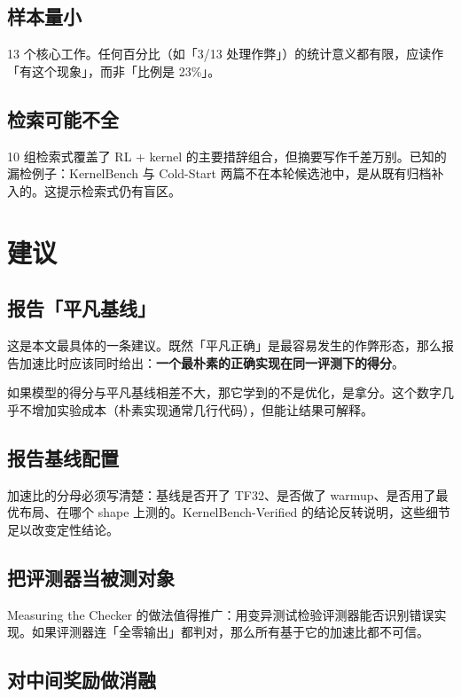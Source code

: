 \subsection{样本量小}

13 个核心工作。任何百分比（如「3/13 处理作弊」）的统计意义都有限，应读作「有这个现象」，而非「比例是 23\%」。

\subsection{检索可能不全}

10 组检索式覆盖了 RL + kernel 的主要措辞组合，但摘要写作千差万别。已知的漏检例子：KernelBench 与 Cold-Start 两篇不在本轮候选池中，是从既有归档补入的。这提示检索式仍有盲区。

\section{建议}

\subsection{报告「平凡基线」}

这是本文最具体的一条建议。既然「平凡正确」是最容易发生的作弊形态，那么报告加速比时应该同时给出：\textbf{一个最朴素的正确实现在同一评测下的得分}。

如果模型的得分与平凡基线相差不大，那它学到的不是优化，是拿分。这个数字几乎不增加实验成本（朴素实现通常几行代码），但能让结果可解释。

\subsection{报告基线配置}

加速比的分母必须写清楚：基线是否开了 TF32、是否做了 warmup、是否用了最优布局、在哪个 shape 上测的。KernelBench-Verified 的结论反转说明，这些细节足以改变定性结论。

\subsection{把评测器当被测对象}

Measuring the Checker 的做法值得推广：用变异测试检验评测器能否识别错误实现。如果评测器连「全零输出」都判对，那么所有基于它的加速比都不可信。

\subsection{对中间奖励做消融}

